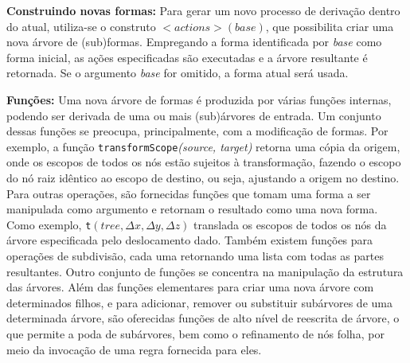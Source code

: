 \begin{figure}[h!]
	\centering
	\captionsetup{width=15cm}
	{}
\end{figure}

\textbf{Construindo novas formas:} Para gerar um novo processo de derivação dentro do atual, utiliza-se o construto $<actions>(base)$, que possibilita criar uma nova árvore de (sub)formas. Empregando a forma identificada por \textit{base} como forma inicial, as ações especificadas são executadas e a árvore resultante é retornada. Se o argumento \textit{base} for omitido, a forma atual será usada.

\textbf{Funções:} Uma nova árvore de formas é produzida por várias funções internas, podendo ser derivada de uma ou mais (sub)árvores de entrada. Um conjunto dessas funções se preocupa, principalmente, com a modificação de formas. Por exemplo, a função \texttt{transformScope}\textit{(source, target)} retorna uma cópia da origem, onde os escopos de todos os nós estão sujeitos à transformação, fazendo o escopo do nó raiz idêntico ao escopo de destino, ou seja, ajustando a origem no destino. Para outras operações, são fornecidas funções que tomam uma forma a ser manipulada como argumento e retornam o resultado como uma nova forma. Como exemplo, \texttt{t}$(tree, \Delta x, \Delta y, \Delta z)$ translada os escopos de todos os nós da árvore especificada pelo deslocamento dado. Também existem funções para operações de subdivisão, cada uma retornando uma lista com todas as partes resultantes. Outro conjunto de funções se concentra na manipulação da estrutura das árvores. Além das funções elementares para criar uma nova árvore com determinados filhos, e para adicionar, remover ou substituir subárvores de uma determinada árvore, são oferecidas funções de alto nível de reescrita de árvore, o que permite a poda de subárvores, bem como o refinamento de nós folha, por meio da invocação de uma regra fornecida para eles.

